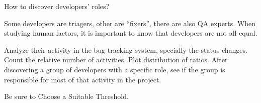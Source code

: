 
\Problem

How to discover developers' roles?

\Context

Some developers are triagers, other are “fixers”, there are also QA experts. When studying human factors, it is important to know that developers are not all equal.

\Solution

Analyze their activity in the bug tracking system, specially the status changes. Count the relative number of activities. Plot distribution of ratios. After discovering a group of developers with a specific role, see if the group is responsible for most of that activity in the project.

\RelatedPatterns

Be sure to Choose a Suitable Threshold.

